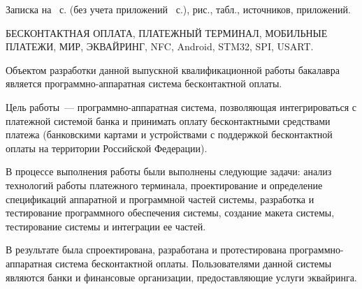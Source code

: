 \newpage


Записка на~\pageref{LastPage} с. (без учета приложений~ с.),  рис., \totaltables{} табл.,  источников,  приложений.

БЕСКОНТАКТНАЯ ОПЛАТА, ПЛАТЕЖНЫЙ ТЕРМИНАЛ, МОБИЛЬНЫЕ ПЛАТЕЖИ, МИР, ЭКВАЙРИНГ, NFC, Android, STM32, SPI, USART.

Объектом разработки данной выпускной квалификационной работы бакалавра является программно-аппаратная система бесконтактной оплаты.

Цель работы~--- программно-аппаратная система, позволяющая интегрироваться с платежной системой банка и принимать оплату бесконтактными средствами платежа (банковскими картами и устройствами с поддержкой бесконтактной оплаты на территории Российской Федерации).

В процессе выполнения работы были выполнены следующие задачи: анализ технологий работы платежного терминала, проектирование и определение спецификаций аппаратной и программной частей системы, разработка и тестирование программного обеспечения системы, создание макета системы, тестирование системы и интеграции ее частей.

В результате была спроектирована, разработана и протестирована программно-аппаратная система бесконтактной оплаты.
Пользователями данной системы являются банки и финансовые организации, предоставляющие услуги эквайринга.
